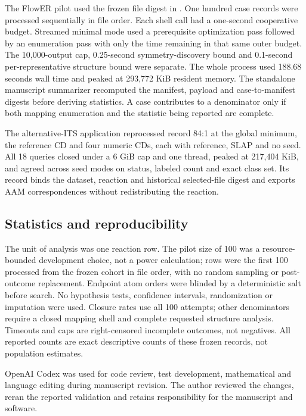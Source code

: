 \documentclass[11pt]{article}
\begin{document}
The FlowER pilot used the frozen file digest in
.  One hundred case
records were processed sequentially in file order.  Each shell call had a
one-second cooperative budget.  Streamed minimal mode used a prerequisite
optimization pass followed by an enumeration pass with only the time remaining
in that same outer budget.  The 10,000-output cap,
0.25-second symmetry-discovery bound and 0.1-second per-representative structure
bound were separate.  The whole process used 188.68 seconds wall time and
peaked at 293,772 KiB resident memory.  The standalone manuscript summarizer
recomputed the manifest, payload and case-to-manifest digests before deriving
statistics.  A case contributes to a denominator only if both mapping
enumeration and the statistic being reported are complete.

The alternative-ITS application reprocessed record 84:1 at the global minimum,
the reference CD and four numeric CDs, each with reference, SLAP and no seed.
All 18 queries closed under a 6 GiB cap and one thread, peaked at 217,404 KiB,
and agreed across seed modes on status, labeled count and exact class set.  Its
record binds the dataset, reaction and historical selected-file digest and
exports AAM correspondences without redistributing the reaction.

\subsection*{Statistics and reproducibility}

The unit of analysis was one reaction row.  The pilot size of 100 was a
resource-bounded development choice, not a power calculation; rows were the
first 100 processed from the frozen cohort in file order, with no random
sampling or post-outcome replacement.  Endpoint atom orders were blinded by a
deterministic salt before search.  No hypothesis tests, confidence intervals,
randomization or imputation were used.  Closure rates use all 100 attempts;
other denominators require a closed mapping shell and complete requested
structure analysis.  Timeouts and caps are right-censored incomplete outcomes,
not negatives.  All reported counts are exact descriptive counts of these
frozen records, not population estimates.

OpenAI Codex was used for code review, test development, mathematical and
language editing during manuscript revision.  The author reviewed the changes,
reran the reported validation and retains responsibility for the manuscript
and software.
\end{document}
